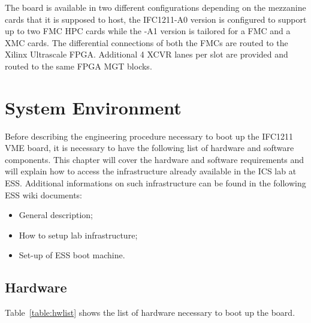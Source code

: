 \documentclass[11pt
  , a4paper
  , article
  , oneside
  , showtrims
]{memoir}
\begin{document}
The board is available in two different configurations depending on the mezzanine cards that it is supposed to host, the IFC1211-A0 version is configured to support up to two FMC HPC cards while the -A1 version is tailored for a FMC and a XMC cards.
The differential connections of both the FMCs are routed to the Xilinx Ultrascale FPGA. Additional 4 XCVR lanes per slot are provided and routed to the same FPGA MGT blocks.



\clearpage

\chapter{System Environment}
Before describing the engineering procedure necessary to boot up the IFC1211 VME board, it is necessary to have the following list of hardware and software components. This chapter will cover the hardware and software requirements and will explain how to access the infrastructure already available in the ICS lab at ESS. Additional informations on such infrastructure can be found in the following ESS wiki documents:
\begin{itemize}
	\item  General description\cite{GDLI};
	\item  How to setup lab infrastructure\cite{SULI};
	\item  Set-up of ESS boot machine\cite{SETUP_LAB_INFRASTRUCTURE}.
\end{itemize}

\section{Hardware}
Table~\ref{table:hwlist} shows the list of hardware necessary to boot up the board. 
\end{document}
